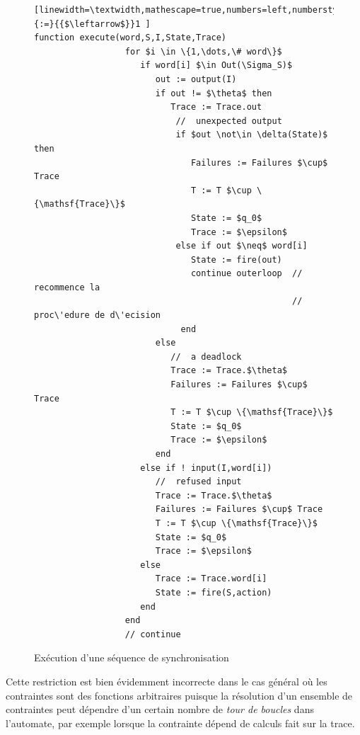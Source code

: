 \begin{figure}[htbp]
    \centering
 \begin{lstlisting}[linewidth=\textwidth,mathescape=true,numbers=left,numberstyle=\tiny,literate={:=}{{$\leftarrow$}}1 ]
function execute(word,S,I,State,Trace)
                  for $i \in \{1,\dots,\# word\}$ 
                     if word[i] $\in Out(\Sigma_S)$        
                        out := output(I) 
                        if out != $\theta$ then
                           Trace := Trace.out
                            //  unexpected output 
                            if $out \not\in \delta(State)$ then 
                               Failures := Failures $\cup$ Trace
                               T := T $\cup \{\mathsf{Trace}\}$
                               State := $q_0$
                               Trace := $\epsilon$
                            else if out $\neq$ word[i]
                               State := fire(out)
                               continue outerloop  // recommence la
                                                   // proc\'edure de d\'ecision
                             end
                        else 
                           //  a deadlock  
                           Trace := Trace.$\theta$
                           Failures := Failures $\cup$ Trace
                           T := T $\cup \{\mathsf{Trace}\}$
                           State := $q_0$
                           Trace := $\epsilon$
                        end
                     else if ! input(I,word[i]) 
                        //  refused input 
                        Trace := Trace.$\theta$
                        Failures := Failures $\cup$ Trace
                        T := T $\cup \{\mathsf{Trace}\}$
                        State := $q_0$
                        Trace := $\epsilon$
                     else
                        Trace := Trace.word[i]
                        State := fire(S,action)
                     end
                  end
                  // continue
 \end{lstlisting}
 \caption{Ex\'ecution d'une s\'equence de synchronisation}
 \label{fig-algo-execute}
 \end{figure}

Cette restriction est bien \'evidemment incorrecte dans le cas
g\'en\'eral o\`u les contraintes sont des fonctions arbitraires
puisque la r\'esolution d'un ensemble de contraintes peut d\'ependre
d'un certain nombre de \emph{tour de boucles} dans l'automate, par
exemple lorsque la contrainte d\'epend de calculs fait sur la trace.


